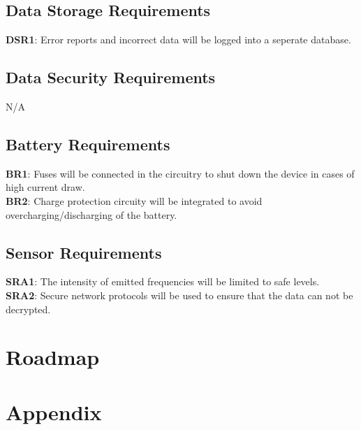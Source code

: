 \documentclass{article}
\begin{document}
\subsection{Data Storage Requirements }
\textbf{DSR1}: Error reports and incorrect data will be logged into a seperate database.\\


\subsection{Data Security Requirements }
N/A

\subsection{Battery Requirements}
\textbf{BR1}: Fuses will be connected in the circuitry to shut down the device in cases of high current draw.
\\
\textbf{BR2}: Charge protection circuity will be integrated to avoid overcharging/discharging of the battery.

\subsection{Sensor Requirements}
\textbf{SRA1}: The intensity of emitted frequencies will be limited to safe levels.
\\
\textbf{SRA2}: Secure network protocols will be used to ensure that the data can not be decrypted.










\section{Roadmap}


\section{Appendix}
\end{document}

